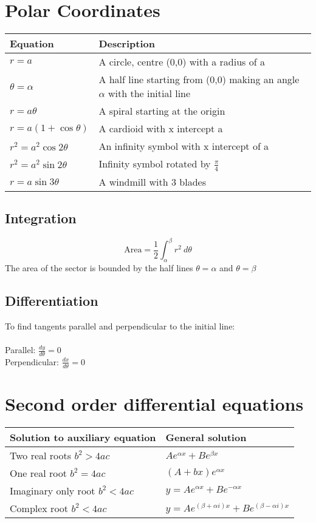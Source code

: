 \documentclass{article}[18pt]
\begin{document}
\section{Polar Coordinates}
\begin{tabularx}{\textwidth}{|X|X|}
\hline
Equation&Description\\
\hline
$r=a$&A circle, centre (0,0) with a radius of a\\
\hline
$\theta=\alpha$&A half line starting from (0,0) making an angle $\alpha$ with the initial line\\
\hline
$r=a\theta$&A spiral starting at the origin\\
\hline
$r=a(1+\cos\theta)$&A cardioid with x intercept a\\
\hline
$r^2=a^2\cos2\theta$&An infinity symbol with x intercept of a\\
\hline
$r^2=a^2\sin2\theta$&Infinity symbol rotated by $\frac{\pi}{4}$\\
\hline
$r=a\sin3\theta$&A windmill with 3 blades\\
\hline
\end{tabularx}
\subsection{Integration}
$$\textrm{Area}=\frac{1}{2}\int_\alpha^\beta r^2 \ d\theta$$
The area of the sector is bounded by the half lines $\theta=\alpha$ and $\theta=\beta$
\subsection{Differentiation}
To find tangents parallel and perpendicular to the initial line:\\
\\
Parallel: $\frac{dy}{d\theta}=0$\\
Perpendicular: $\frac{dx}{d\theta}=0$
\section{Second order differential equations}
{\renewcommand{\arraystretch}{2}
\begin{tabularx}{\textwidth}{|X|X|}
\hline
\textbf{Solution to auxiliary equation}&\textbf{General solution}\\
\hline
Two real roots $b^2>4ac$&$Ae^{\alpha x}+Be^{\beta x}$\\
\hline
One real root $b^2=4ac$&$(A+bx)e^{\alpha x}$\\
\hline
Imaginary only root $b^2<4ac$&$y=Ae^{\alpha x}+Be^{-\alpha x}$\\
\hline
Complex root $b^2<4ac$&$y=Ae^{(\beta+\alpha i)x}+Be^{(\beta-\alpha i)x}$\\
\hline
\end{tabularx}}
\end{document}
